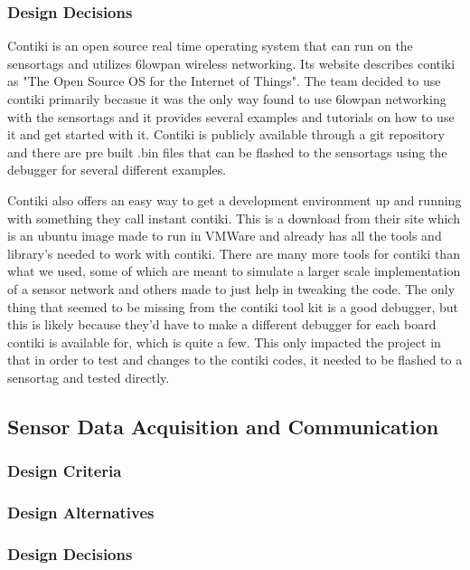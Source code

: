 \documentclass[PPFS.tex]{template/subfiles}
\begin{document}
\subsubsection{Design Decisions}
Contiki is an open source real time operating system that can run on the sensortags and utilizes 6lowpan wireless networking. Its website describes contiki as "The Open Source OS for the Internet of Things". The team decided to use contiki primarily becasue it was the only way found to use 6lowpan networking with the sensortags and it provides several examples and tutorials on how to use it and get started with it. Contiki is publicly available through a git repository and there are pre built .bin files that can be flashed to the sensortags using the debugger for several different examples. 

Contiki also offers an easy way to get a development environment up and running with something they call instant contiki. This is a download from their site which is an ubuntu image made to run in VMWare and already has all the tools and library's needed to work with contiki. There are many more tools for contiki than what we used, some of which are meant to simulate a larger scale implementation of a sensor network and others made to just help in tweaking the code. The only thing that seemed to be missing from the contiki tool kit is a good debugger, but this is likely because they'd have to make a different debugger for each board contiki is available for, which is quite a few. This only impacted the project in that in order to test and changes to the contiki codes, it needed to be flashed to a sensortag and tested directly. 

\subsection{Sensor Data Acquisition and Communication}

\subsubsection{Design Criteria}

\subsubsection{Design Alternatives}

\subsubsection{Design Decisions}
\end{document}
